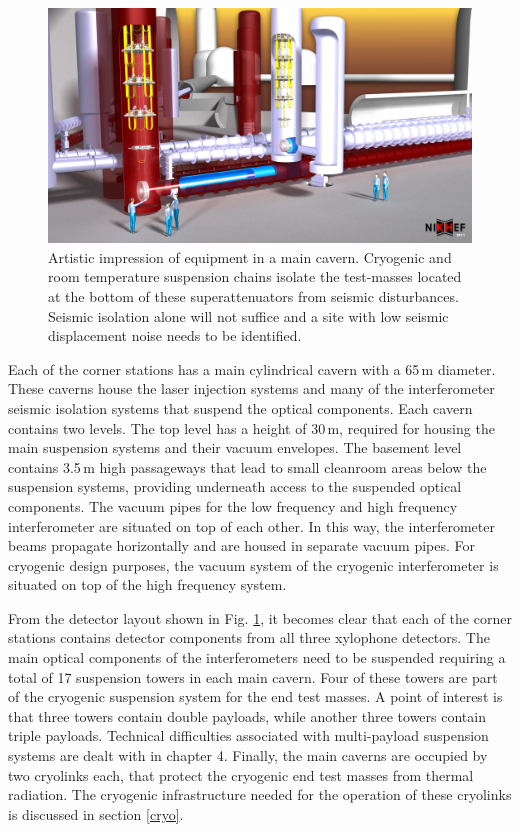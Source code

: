 \begin{figure}[h!]
	\begin{center}
		 \includegraphics[width=17cm]{./Sec_SiteInfra/Figures/SuspensionArtistic2.jpg}
			\caption{Artistic impression of equipment in a main cavern. Cryogenic and room temperature suspension chains isolate the test-masses located at the bottom of these superattenuators from seismic disturbances. Seismic isolation alone will not suffice and a site with low seismic displacement noise needs to be identified.}		
			\label{SuspensionArtistic}
	\end{center}
\end{figure}

Each of the corner stations has a main cylindrical cavern with a 65\,m diameter. These caverns house the laser injection systems and many of the interferometer seismic isolation systems that suspend the optical components. Each cavern contains two levels. The top level has a height of 30\,m, required for housing the main suspension systems and their vacuum envelopes. The basement level contains 3.5\,m high passageways that lead to small cleanroom areas below the suspension systems, providing underneath access to the suspended optical components. The vacuum pipes for the low frequency and high frequency interferometer are situated on top of each other. In this way, the interferometer beams propagate horizontally and are housed in separate vacuum pipes. For cryogenic design purposes, the vacuum system of the cryogenic interferometer is situated on top of the high frequency system.

From the detector layout shown in Fig. \ref{SuspensionArtistic}, it becomes clear that each of the corner stations contains detector components from all three xylophone detectors. The main optical components of the interferometers need to be suspended requiring a total of 17 suspension towers in each main cavern. Four of these towers are part of the cryogenic suspension system for the end test masses. A point of interest is that three towers contain double payloads, while another three towers contain triple payloads. Technical difficulties associated with multi-payload suspension systems are dealt with in chapter 4. Finally, the main caverns are occupied by two cryolinks each, that protect the cryogenic end test masses from thermal radiation. The cryogenic infrastructure needed for the operation of these cryolinks is discussed in section \ref{cryo}.

